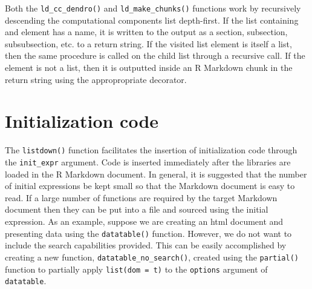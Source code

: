 \documentclass[
]{jss}
\begin{document}
Both the \texttt{ld\_cc\_dendro()} and \texttt{ld\_make\_chunks()}
functions work by recursively descending the computational components
list depth-first. If the list containing and element has a name, it is
written to the output as a section, subsection, subsubsection, etc. to a
return string. If the visited list element is itself a list, then the
same procedure is called on the child list through a recursive call. If
the element is not a list, then it is outputted inside an R Markdown
chunk in the return string using the appropropriate decorator.

\hypertarget{initialization-code}{%
\section{Initialization code}\label{initialization-code}}

The \texttt{listdown()} function facilitates the insertion of
initialization code through the \texttt{init\_expr} argument. Code is
inserted immediately after the libraries are loaded in the R Markdown
document. In general, it is suggested that the number of initial
expressions be kept small so that the  Markdown document is
easy to read. If a large number of functions are required by the target
 Markdown document then they can be put into a file and
sourced using the initial expression. As an example, suppose we are
creating an html document and presenting data using the
\texttt{datatable()} function. However, we do not want to include the
search capabilities provided. This can be easily accomplished by
creating a new function, \texttt{datatable\_no\_search()}, created using
the \texttt{partial()} function \cite{purrr} to partially apply
\texttt{list(dom\ =\ \textquotesingle{}t\textquotesingle{})} to the
\texttt{options} argument of \texttt{datatable}.
\end{document}
